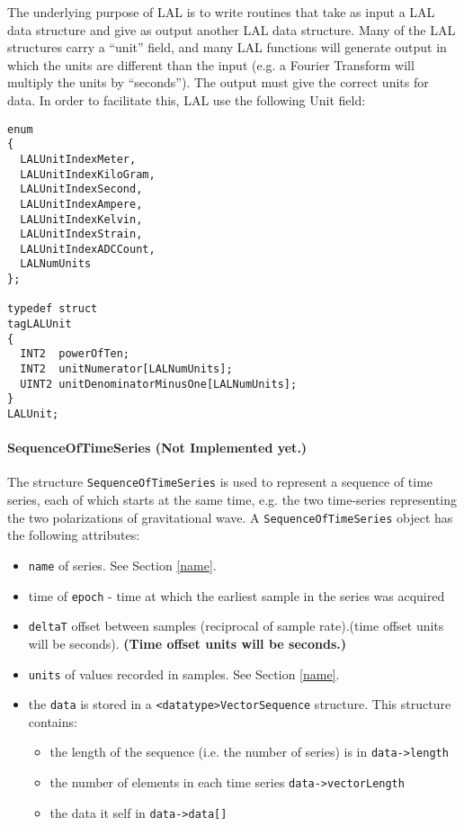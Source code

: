 \documentclass[]{ligodcc}
\renewcommand{\texttt}[1]{{\ttfamily\color{blue}#1}}
\begin{document}
The underlying purpose of LAL is to write routines that take as input
a LAL data structure and give as output another LAL data structure.
Many of the LAL structures carry a ``unit'' field, and many LAL
functions will generate output in which the  units are different than
the input (e.g. a Fourier Transform will multiply the units by
``seconds'').  The output must give the correct units for data.  In
order to facilitate this, LAL use the following Unit field:

{\footnotesize
\begin{verbatim}
enum
{
  LALUnitIndexMeter,
  LALUnitIndexKiloGram,
  LALUnitIndexSecond,
  LALUnitIndexAmpere,
  LALUnitIndexKelvin,
  LALUnitIndexStrain,
  LALUnitIndexADCCount,
  LALNumUnits
};

typedef struct
tagLALUnit
{
  INT2  powerOfTen;
  INT2  unitNumerator[LALNumUnits];
  UINT2 unitDenominatorMinusOne[LALNumUnits];
}
LALUnit;
\end{verbatim}}


\paragraph{{\texttt {SequenceOfTimeSeries}}  {\bf (Not Implemented yet.)} \\}

The structure {\tt SequenceOfTimeSeries} is used to represent a sequence of
time series, each of which starts at the same time, e.g. the two
time-series representing the two polarizations of gravitational
wave. A  {\tt SequenceOfTimeSeries} object has the following attributes:

\begin{itemize}
\vspace{-0.15in}
\item
{\tt name} of series.  See Section \ref{name}.
\vspace{-0.15in}
\item
time of {\tt epoch} - time at which the earliest sample in the series was acquired
\vspace{-0.15in}
\item
{\tt deltaT} offset between samples (reciprocal of sample
rate).(time offset units will be seconds).  {\bf (Time offset units will
be seconds.)}
\vspace{-0.15in}
\item
{\tt units} of values recorded in samples. See Section \ref{name}.
\vspace{-0.15in}
\item
the {\tt data} is stored in a {\tt <datatype>VectorSequence}  structure.
This structure contains:
\begin{itemize}
\vspace{-0.10in}
\item
the length of the sequence (i.e. the number of series) is  in 
{\tt data->length}
\vspace{-0.10in}
\item
the number of elements in each time series {\tt data->vectorLength}
\vspace{-0.10in}
\item
the data it self in {\tt data->data[]}
\end{itemize}
\end{itemize}
\end{document}
